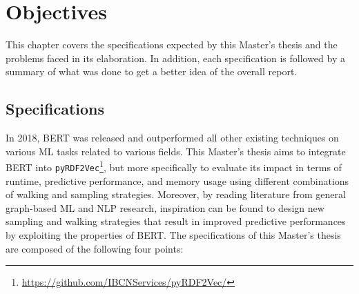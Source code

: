 
\chapter{Objectives}
\label{chap:objectives}

This chapter covers the specifications expected by this Master's thesis and the
problems faced in its elaboration. In addition, each specification is followed
by a summary of what was done to get a better idea of the overall report.

\section{Specifications}
\label{sec:objectives:specifications}

In 2018, BERT was released and outperformed all other existing techniques on
various ML tasks related to various fields. This Master's thesis aims to
integrate BERT into
\texttt{pyRDF2Vec}\footnote{\url{https://github.com/IBCNServices/pyRDF2Vec/}},
but more specifically to evaluate its impact in terms of runtime, predictive
performance, and memory usage using different combinations of walking and
sampling strategies. Moreover, by reading literature from general graph-based ML
and NLP research, inspiration can be found to design new sampling and walking
strategies that result in improved predictive performances by exploiting the
properties of BERT. The specifications of this Master's thesis are composed of
the following four points:
